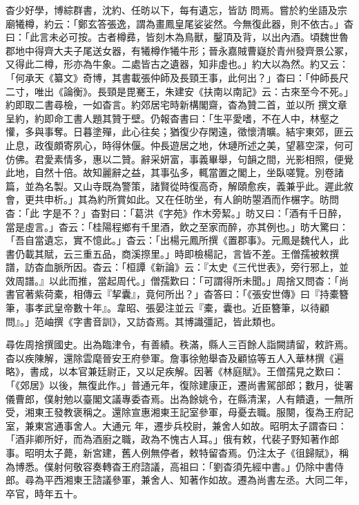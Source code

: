 \begin{pinyinscope}
 杳少好學，博綜群書，沈約、任昉以下，每有遺忘，皆訪
 問焉。嘗於約坐語及宗廟犧樽，約云：「鄭玄答張逸，謂為畫鳳皇尾娑娑然。今無復此器，則不依古。」杳曰：「此言未必可按。古者樽彞，皆刻木為鳥獸，鑿頂及背，以出內酒。頃魏世魯郡地中得齊大夫子尾送女器，有犧樽作犧牛形；晉永嘉賊曹嶷於青州發齊景公冢，又得此二樽，形亦為牛象。二處皆古之遺器，知非虛也。」約大以為然。約又云：「何承天《纂文》奇博，其書載張仲師及長頸王事，此何出？」杳曰：「仲師長尺二寸，唯出《論衡》。長頸是毘騫王，朱建安《扶南以南記》云：古來至今不死。」約即取二書尋檢，一如杳言。約郊居宅時新構閣齋，杳為贊二首，並以所
 撰文章呈約，約即命工書人題其贊于壁。仍報杳書曰：「生平愛嗜，不在人中，林壑之懽，多與事奪。日暮塗殫，此心往矣；猶復少存閑遠，徵懷清曠。結宇東郊，匪云止息，政復頗寄夙心，時得休偃。仲長遊居之地，休璉所述之美，望慕空深，何可仿佛。君愛素情多，惠以二贊。辭采妍富，事義畢舉，句韻之間，光影相照，便覺此地，自然十倍。故知麗辭之益，其事弘多，輒當置之閣上，坐臥嗟覽。別卷諸篇，並為名製。又山寺既為警策，諸賢從時復高奇，解頤愈疾，義兼乎此。遲此敘會，更共申析。」其為約所賞如此。又在任昉坐，有人餉昉曌酒而作榐字。昉問杳：「此
 字是不？」杳對曰：「葛洪《字苑》作木旁絜。」昉又曰：「酒有千日醉，當是虛言。」杳云：「桂陽程鄉有千里酒，飲之至家而醉，亦其例也。」昉大驚曰：「吾自當遺忘，實不憶此。」杳云：「出楊元鳳所撰《置郡事》。元鳳是魏代人，此書仍載其賦，云三重五品，商溪摖里。」時即檢楊記，言皆不差。王僧孺被敕撰譜，訪杳血脈所因。杳云：「桓譚《新論》云：『太史《三代世表》，旁行邪上，並效周譜。』以此而推，當起周代。」僧孺歎曰：「可謂得所未聞。」周捨又問杳：「尚書官著紫荷橐，相傳云『挈囊』，竟何所出？」杳答曰：「《張安世傳》曰『持橐簪筆，事孝武皇帝數十年』。韋昭、張晏注並云『橐，囊也。近臣簪筆，以待顧
 問』。」范岫撰《字書音訓》，又訪杳焉。其博識彊記，皆此類也。



 尋佐周捨撰國史。出為臨津令，有善績。秩滿，縣人三百餘人詣闕請留，敕許焉。杳以疾陳解，還除雲麾晉安王府參軍。詹事徐勉舉杳及顧協等五人入華林撰《遍略》，書成，以本官兼廷尉正，又以足疾解。因著《林庭賦》。王僧孺見之歎曰：「《郊居》以後，無復此作。」普通元年，復除建康正，遷尚書駕部郎；數月，徙署儀曹郎，僕射勉以臺閣文議專委杳焉。出為餘姚令，在縣清潔，人有饋遺，一無所受，湘東王發教褒稱之。還除宣惠湘東王記室參軍，母憂去職。服闋，復為王府記室，兼東宮通事舍人。大通元
 年，遷步兵校尉，兼舍人如故。昭明太子謂杳曰：「酒非卿所好，而為酒廚之職，政為不愧古人耳。」俄有敕，代裴子野知著作郎事。昭明太子薨，新宮建，舊人例無停者，敕特留杳焉。仍注太子《徂歸賦》，稱為博悉。僕射何敬容奏轉杳王府諮議，高祖曰：「劉杳須先經中書。」仍除中書侍郎。尋為平西湘東王諮議參軍，兼舍人、知著作如故。遷為尚書左丞。大同二年，卒官，時年五十。




\end{pinyinscope}
